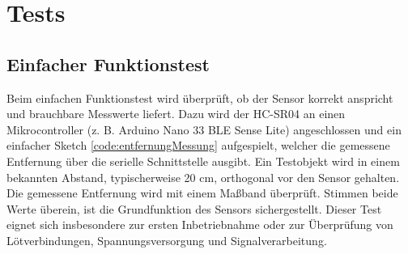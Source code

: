 \begin{code}[H]
	\caption{Einfache Anwendung als Schwellenwert-Melder}
	\label{code:schwellenwert}
\end{code}


\section{Tests}
\subsection{Einfacher Funktionstest}
Beim einfachen Funktionstest wird überprüft, ob der Sensor korrekt anspricht und brauchbare
Messwerte liefert. Dazu wird der HC-SR04 an einen Mikrocontroller (z. B. Arduino Nano 33 BLE
Sense Lite) angeschlossen und ein einfacher Sketch  \ref{code:entfernungMessung} aufgespielt, welcher die gemessene
Entfernung über die serielle Schnittstelle ausgibt. \cite{Hering:2023}
Ein Testobjekt wird in einem bekannten Abstand, typischerweise 20 cm, orthogonal vor den
Sensor gehalten. Die gemessene Entfernung wird mit einem Maßband überprüft. Stimmen beide
Werte überein, ist die Grundfunktion des Sensors sichergestellt. Dieser Test eignet sich
insbesondere zur ersten Inbetriebnahme oder zur Überprüfung von Lötverbindungen,
Spannungsversorgung und Signalverarbeitung.

\begin{code}[H]
	\caption{Code für die Messung einer Strecke}
	\label{code:entfernungMessung}
\end{code}

